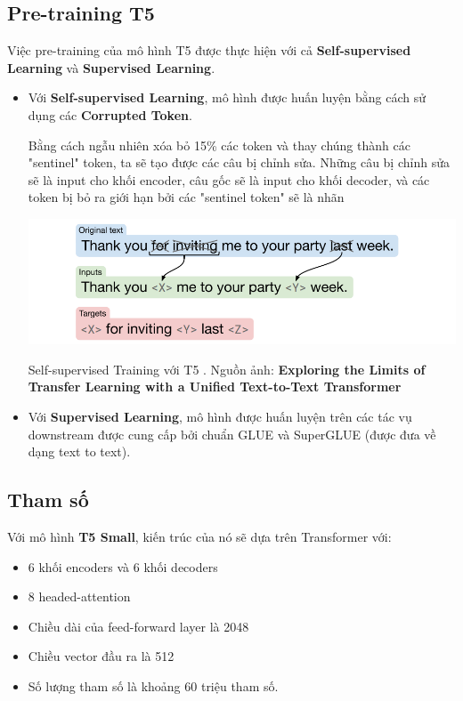 \documentclass[a4paper, 10pt]{article}
\begin{document}
\subsection{Pre-training T5}
Việc pre-training của mô hình T5 được thực hiện với cả  \textbf{Self-supervised Learning} và \textbf{Supervised Learning}.
\begin{itemize}
    \item Với \textbf{Self-supervised Learning}, mô hình được huấn luyện bằng cách sử dụng các \textbf{Corrupted Token}. 
    
    Bằng cách ngẫu nhiên xóa bỏ 15\% các token
    và thay chúng thành các "sentinel" token, ta sẽ tạo được các câu bị chỉnh sửa.
    Những câu bị chỉnh sửa sẽ là input cho khối encoder, câu gốc sẽ là input cho khối decoder, và các token bị bỏ ra giới hạn bởi các "sentinel token" sẽ là nhãn
    
    \begin{minipage}{\linewidth}
        \captionsetup{type=figure}
        \centering
        \includegraphics[width=14cm]{./t5_train.png}
        \caption{Self-supervised Training với T5 . Nguồn ảnh: \textbf{Exploring the Limits of Transfer Learning with a Unified Text-to-Text Transformer}}
    \end{minipage}

    \item Với \textbf{Supervised Learning}, mô hình được huấn luyện trên các tác vụ downstream được cung cấp bởi chuẩn GLUE và SuperGLUE (được đưa về dạng text to text).
\end{itemize}

\subsection{Tham số}
Với mô hình \textbf{T5 Small}, kiến trúc của nó sẽ dựa trên Transformer với:
\begin{itemize}
    \item 6 khối encoders và 6 khối decoders 
    \item 8 headed-attention
    \item Chiều dài của feed-forward layer là 2048
    \item Chiều vector đầu ra là 512
    \item Số lượng tham số là khoảng 60 triệu tham số.
\end{itemize}
\end{document}
